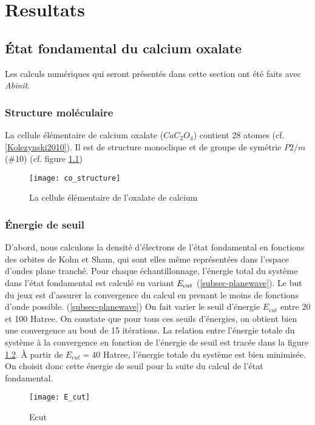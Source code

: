 \chapter{Resultats}

\label{Chap-Res}

\section{État fondamental du calcium oxalate}
Les calculs numériques qui seront présentés dans cette section ont été faits avec \textit{Abinit}.

\subsection{Structure moléculaire}
La cellule élémentaire de calcium oxalate ($Ca C_2 O_4$) contient 28 atomes (cf. \cref{Kolezynski2010}). Il est de structure monoclique et de groupe de symétrie $P2/m$ ($\#$10) (cf. figure \cref{BrillouinZone})

\begin{figure}[!h]\label{BrillouinZone}
    \centering
    \texttt{[image: co\_structure]}
    \caption{La cellule élémentaire de l'oxalate de calcium}
\end{figure}
\subsection{Énergie de seuil}
D'abord, nous calculons la densité d'électrons de l'état fondamental
en fonctions des orbites de Kohn et Sham,
qui sont elles même représentées dans l'espace d'ondes plane tranché.
Pour chaque échantillonnage, l'énergie total du système dans l'état fondamental est calculé
en variant $E_{\textnormal{cut}}$ (\cref{subsec-planewave}).
Le but du jeux est d'assurer la convergence du calcul en prenant le moins de fonctions d'onde possible. (\cref{subsec-planewave})
On fait varier le seuil d'énergie $E_{cut}$ entre 20 et 100 Hatree. 
On constate que pour tous ces seuils d'énergies, on obtient bien une convergence au bout de 15 itérations. La relation entre l'énergie totale du système à la convergence en fonction de l'énergie de seuil est tracée dans la figure \ref{Ecut}. 
À partir de $E_{cut} = 40$ Hatree, l'énergie totale du système est bien minimisée. On choisit donc cette énergie de seuil pour la suite du calcul de l'état fondamental. 

\begin{figure}[!h]\label{Ecut}
    \centering
    \texttt{[image: E\_cut]}
    \caption{Ecut}
\end{figure}

